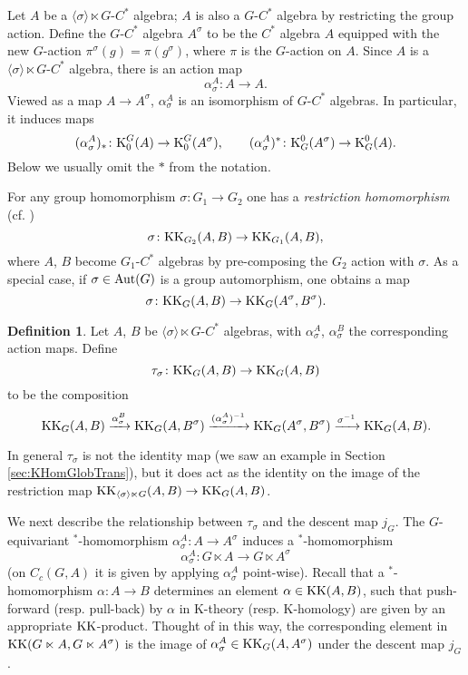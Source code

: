 \documentclass[11pt,reqno]{amsart}
\theoremstyle{definition}
\newtheorem{definition}[theorem]{Definition}
\theoremstyle{remark}
\def\K{\ensuremath{\mathcal{K}}}
\def\Aut{\ensuremath{\textnormal{Aut}}}
\def\KK{\ensuremath{\textnormal{KK}}}
\def\K{\ensuremath{\textnormal{K}}}
\begin{document}
Let $A$ be a $\langle \sigma \rangle \ltimes G$-$C^\ast$ algebra; $A$ is also a $G$-$C^\ast$ algebra by restricting the group action.  Define the $G$-$C^\ast$ algebra $A^\sigma$ to be the $C^\ast$ algebra $A$ equipped with the new $G$-action $\pi^\sigma(g)=\pi(g^\sigma)$, where $\pi$ is the $G$-action on $A$.  Since $A$ is a $\langle \sigma \rangle \ltimes G$-$C^\ast$ algebra, there is an action map 
\[ \alpha^A_\sigma \colon A \rightarrow A.\]  
Viewed as a map $A \rightarrow A^\sigma$, $\alpha^A_\sigma$ is an isomorphism of $G$-$C^\ast$ algebras.  In particular, it induces maps
\[ (\alpha^A_\sigma)_\ast \colon \K_0^G(A) \rightarrow \K_0^G(A^\sigma), \qquad (\alpha^A_\sigma)^\ast \colon \K^0_G(A^\sigma) \rightarrow \K^0_G(A).\]
Below we usually omit the $\ast$ from the notation.

For any group homomorphism $\sigma \colon G_1 \rightarrow G_2$ one has a \emph{restriction homomorphism} (cf. \cite{KasparovNovikov})
\[ \sigma \colon \KK_{G_2}(A,B) \rightarrow \KK_{G_1}(A,B),\]
where $A$, $B$ become $G_1$-$C^\ast$ algebras by pre-composing the $G_2$ action with $\sigma$.  As a special case, if $\sigma \in \Aut(G)$ is a group automorphism, one obtains a map
\[ \sigma \colon \KK_G(A,B) \rightarrow \KK_G(A^\sigma,B^\sigma).\]

\begin{definition}
Let $A$, $B$ be $\langle \sigma \rangle \ltimes G$-$C^\ast$ algebras, with $\alpha_\sigma^A$, $\alpha_\sigma^B$ the corresponding action maps.  Define
\[ \tau_\sigma \colon \KK_G(A,B) \rightarrow \KK_G(A,B) \]
to be the composition
\[ \KK_G(A,B) \xrightarrow{\alpha_\sigma^B} \KK_G(A,B^\sigma) \xrightarrow{(\alpha_\sigma^A)^{-1}} \KK_G(A^\sigma,B^\sigma) \xrightarrow{\sigma^{-1}} \KK_G(A,B).\]
\end{definition}
In general $\tau_\sigma$ is not the identity map (we saw an example in Section \ref{sec:KHomGlobTrans}), but it does act as the identity on the image of the restriction map $\KK_{\langle \sigma \rangle \ltimes G}(A,B) \rightarrow \KK_G(A,B)$.

We next describe the relationship between $\tau_\sigma$ and the descent map $j_G$.  The $G$-equivariant $^\ast$-homomorphism $\alpha^A_\sigma \colon A \rightarrow A^\sigma$ induces a $^\ast$-homomorphism
\begin{equation}
\label{eqn:descentalpha}
\alpha^A_\sigma \colon G \ltimes A \rightarrow G \ltimes A^\sigma 
\end{equation}
(on $C_c(G,A)$ it is given by applying $\alpha^A_\sigma$ point-wise).  Recall that a $^\ast$-homomorphism $\alpha \colon A \rightarrow B$ determines an element $\alpha \in \KK(A,B)$, such that push-forward (resp. pull-back) by $\alpha$ in K-theory (resp. K-homology) are given by an appropriate $\KK$-product.  Thought of in this way, the corresponding element in $\KK(G\ltimes A,G\ltimes A^\sigma)$ is the image of $\alpha^A_\sigma \in \KK_G(A,A^\sigma)$ under the descent map $j_G$.
\end{document}
